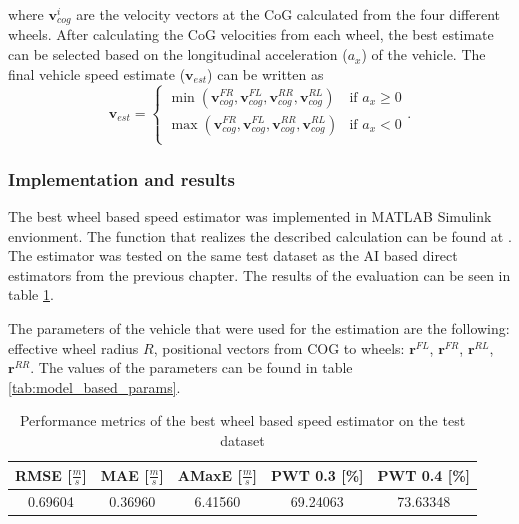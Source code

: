 where $\mathbf{v}_{cog}^{i}$ are the velocity vectors at the CoG calculated from the four different wheels. After calculating the CoG velocities from each wheel, the best estimate can be selected based on the longitudinal acceleration ($a_x$) of the vehicle. The final vehicle speed estimate ($\mathbf{v}_{est}$) can be written as
\begin{equation}
    \mathbf{v}_{est} = 
    \begin{cases} 
      \min(\mathbf{v}_{cog}^{FR}, \mathbf{v}_{cog}^{FL}, \mathbf{v}_{cog}^{RR}, \mathbf{v}_{cog}^{RL}) & \text{if } a_x \geq 0 \\
      \max(\mathbf{v}_{cog}^{FR}, \mathbf{v}_{cog}^{FL}, \mathbf{v}_{cog}^{RR}, \mathbf{v}_{cog}^{RL}) & \text{if } a_x < 0 \\
   \end{cases}.
\end{equation}

\subsubsection{Implementation and results}

The best wheel based speed estimator was implemented in MATLAB Simulink envionment. The function that realizes the described calculation can be found at . The estimator was tested on the same test dataset as the AI based direct estimators from the previous chapter. The results of the evaluation can be seen in table \ref{tab:best_wheel_estimator_results}. 

The parameters of the vehicle that were used for the estimation are the following: effective wheel radius $R$, positional vectors from COG to wheels: $\mathbf{r}^{FL}$, $\mathbf{r}^{FR}$, $\mathbf{r}^{RL}$, $\mathbf{r}^{RR}$. The values of the parameters can be found in table \ref{tab:model_based_params}.

\FloatBarrier
\begin{table}[h]
    \centering
    \begin{tabular}{|c|c|c|c|c|}
        \hline
        \textbf{RMSE [$\frac{m}{s}$]} & \textbf{MAE [$\frac{m}{s}$]} & \textbf{AMaxE [$\frac{m}{s}$]} & \textbf{PWT 0.3 [\%]} & \textbf{PWT 0.4 [\%]} \\
        \hline \hline
        0.69604	& 0.36960 & 6.41560 & 69.24063 & 73.63348 \\
        \hline
    \end{tabular}
    \caption{Performance metrics of the best wheel based speed estimator on the test dataset}
    \label{tab:best_wheel_estimator_results}
\end{table}
\FloatBarrier  

